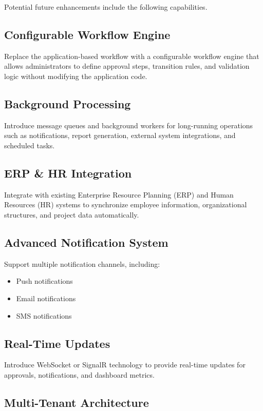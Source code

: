 \documentclass[11pt]{article}
\begin{document}
Potential future enhancements include the following capabilities.

\subsection{Configurable Workflow Engine}

Replace the application-based workflow with a configurable workflow engine
that allows administrators to define approval steps, transition rules, and
validation logic without modifying the application code.

\subsection{Background Processing}

Introduce message queues and background workers for long-running operations
such as notifications, report generation, external system integrations, and
scheduled tasks.

\subsection{ERP \& HR Integration}

Integrate with existing Enterprise Resource Planning (ERP) and Human Resources
(HR) systems to synchronize employee information, organizational structures,
and project data automatically.

\subsection{Advanced Notification System}

Support multiple notification channels, including:

\begin{itemize}
    \item Push notifications
    \item Email notifications
    \item SMS notifications
\end{itemize}

\subsection{Real-Time Updates}

Introduce WebSocket or SignalR technology to provide real-time updates for
approvals, notifications, and dashboard metrics.

\subsection{Multi-Tenant Architecture}
\end{document}
